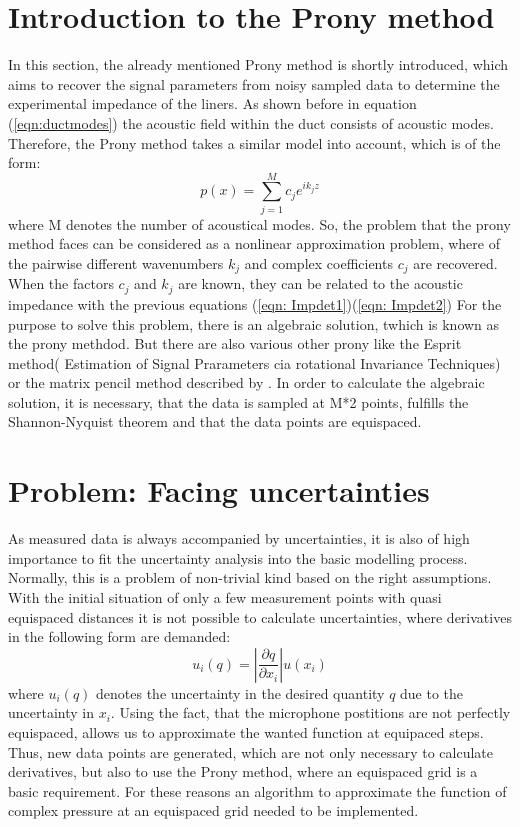 \documentclass[11pt]{report} %
\begin{document}
\section{Introduction to the Prony method}
In this section, the already mentioned Prony method is shortly introduced, which aims to recover the signal parameters from noisy sampled data to determine the experimental impedance of the liners.
As shown before in equation (\eqref{eqn:ductmodes}) the acoustic field within the duct consists of acoustic modes. 
Therefore, the Prony method takes a similar model into account, which is of the form: 
\begin{equation}\label{eqn: expsum}
 p(x)=\sum\limits_{j=1}^M c_{j}e^{ik_{j}z} 
\end{equation}
where M denotes the number of acoustical modes. 
So, the problem that the prony method faces  can be considered as a nonlinear approximation problem, where of the  pairwise different wavenumbers $k_{j}$ and complex coefficients $c_{j}$ are recovered.
When the factors $c_j$ and $k_j$ are known, they can be related to the acoustic impedance with the previous equations (\ref{eqn: Impdet1})(\ref{eqn: Impdet2})
For the purpose to solve this problem, there is an algebraic solution, twhich is known as the prony methdod. But there are also various other prony like the Esprit method( Estimation of Signal Prarameters cia rotational Invariance Techniques) or the matrix pencil method described by \cite{Potts}.
In order to calculate the algebraic solution, it is necessary, that the data is sampled at M*2 points, fulfills the Shannon-Nyquist theorem and that the data points are equispaced. 

\section{Problem: Facing uncertainties}
As measured data is always accompanied by uncertainties, it is also of high importance to fit the uncertainty analysis into the basic modelling process.
Normally, this is a problem of non-trivial kind based on the right assumptions.
With the initial situation of only a few measurement points with quasi equispaced distances it is not possible to calculate uncertainties, where derivatives in the following form are demanded:
\begin{equation}
u_{i}(q)= \left\vert \frac{\partial q}{\partial x_{i}} \right\vert u( x_{i})
\end{equation}
where $u_{i}(q)$ denotes the uncertainty in the desired quantity $q$ due to the uncertainty in $x_{i}$.
Using the fact, that the microphone postitions are not perfectly equispaced, allows us to approximate the wanted function at equipaced steps.
Thus, new data points are generated, which are not only necessary to calculate derivatives, but also to use the Prony method, where an equispaced grid is a basic requirement.
For these reasons an algorithm to approximate the function of complex pressure at an equispaced grid needed to be implemented. 
  
\end{document}
